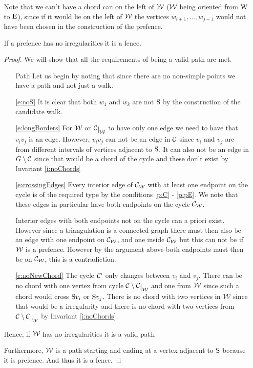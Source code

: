   Note that we can't have a chord can on the left of $\mathcal{W}$ ($\mathcal{W}$ being oriented from $\mathrm{W}$ to $\mathrm{E}$), since if it would lie on the left of $\mathcal{W}$ the vertices $w_{i+1},\ldots, w_{j-1}$ would not have been chosen in the construction of the prefence.

  \begin{lemma}
    \label{lm:red:regularPrefenceIsFence}
    If a prefence has no irregularities it is a fence.
  \end{lemma}
  \begin{proof}
    We will show that all the requirements of being a valid path are met.
   \begin{itemize}
     \item [Path] Let us begin by noting that since there are no non-simple points we have a path and not just a walk.

     \item[\ref{e:noS}] It is clear that both $w_1$ and $w_k$ are not $\mathrm{S}$ by the construction of the candidate walk.

     \item[\ref{e:longBorders}] For $\mathcal{W}$ or $\restC \W$ to have only one edge we need to have that $v_i v_j$ is an edge. However, $v_i v_j$ can not be an edge in $\mathcal{C}$ since $v_i$ and $v_j$ are from different intervals of vertices adjacent to $\mathrm{S}$. It can also not be an edge in $\bar{G} \setminus \mathcal{C}$ since that would be a chord of the cycle and these don't exist by Invariant \ref{i:noChords}

     \item[\ref{e:crossingEdges}]
     Every interior edge of $\mathcal{C}_{\mathcal{W}}$  with at least one endpoint on the cycle is of the required type by the conditions \ref{p:C} - \ref{p:pE}. We note that these edges in particular have both endpoints on the cycle $\mathcal{C}_{\mathcal{W}}$.

     Interior edges with both endpoints not on the cycle can a priori exist. However since a triangulation is a connected graph there must then also be an edge with one endpoint on $\mathcal{C}_{\mathcal{W}}$, and one inside $\mathcal{C}_{\mathcal{W}}$ but this can not be if $\mathcal{W}$ is a prefence. However by the argument above both endpoints must then be on $\mathcal{C}_{\mathcal{W}}$, this is a contradiction.

     \item[\ref{e:noNewChord}] The cycle $\mathcal{C}'$ only changes between $v_i$ and $v_j$. There can be no chord with one vertex from cycle $\C \setminus \restC{\W}$ and one from $\mathcal{W}$ since such a chord would cross $\mathrm{S} v_i$ or $\mathrm{S} v_j$. There is no chord with two vertices in $\mathcal{W}$ since that would be a irregularity and there is no chord with two vertices from $\C \setminus \restC{\W}$ by Invariant \ref{i:noChords}.
   \end{itemize}
   Hence, if $\mathcal{W}$ has no irregularities it is a valid path.

   Furthermore, $\mathcal{W}$ is a path starting and ending at a vertex adjacent to $\mathrm{S}$ because it is prefence. And thus it is a fence.
  \end{proof}


